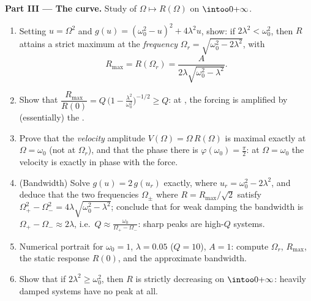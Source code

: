 \begin{problem}
\medskip
\noindent\textbf{Part III --- The  curve.} Study of
$\Omega \mapsto R(\Omega)$ on $\intoo0{+\infty}$.
\begin{enumerate}[resume]
  \item Setting $u = \Omega^2$ and $g(u) = (\omega_0^2 - u)^2 +
        4\lambda^2 u$, show: if $2\lambda^2 < \omega_0^2$, then $R$
        attains a strict maximum at the \emph{ frequency}
        $\Omega_r = \sqrt{\omega_0^2 - 2\lambda^2}$, with
        \[
        R_{\max} = R(\Omega_r)
        = \frac{A}{2\lambda\sqrt{\omega_0^2 - \lambda^2}} .
        \]
  \item Show that $\dfrac{R_{\max}}{R(0)} = Q\,\bigl(1 -
        \tfrac{\lambda^2}{\omega_0^2}\bigr)^{-1/2} \geq Q$: at
        , the forcing is amplified by (essentially) the
        .
  \item Prove that the \emph{velocity} amplitude $V(\Omega) =
        \Omega\,R(\Omega)$ is maximal exactly at $\Omega =
        \omega_0$ (not at $\Omega_r$), and that the phase there is
        $\varphi(\omega_0) = \frac\pi2$: at $\Omega = \omega_0$
        the velocity is exactly in phase with the force.
  \item (Bandwidth) Solve $g(u) = 2\,g(u_r)$ exactly, where $u_r =
        \omega_0^2 - 2\lambda^2$, and deduce that the two
        frequencies $\Omega_\pm$ where $R = R_{\max}/\sqrt2$
        satisfy $\Omega_+^2 - \Omega_-^2 =
        4\lambda\sqrt{\omega_0^2 - \lambda^2}$; conclude that for
        weak damping the bandwidth is $\Omega_+ - \Omega_-
        \approx 2\lambda$, i.e.\ $Q \approx
        \frac{\omega_0}{\Omega_+ - \Omega_-}$: sharp 
        peaks are high-$Q$ systems.
  \item Numerical portrait for $\omega_0 = 1$, $\lambda = 0.05$
        ($Q = 10$), $A = 1$: compute $\Omega_r$, $R_{\max}$, the
        static response $R(0)$, and the approximate bandwidth.
  \item Show that if $2\lambda^2 \geq \omega_0^2$, then $R$ is
        strictly decreasing on $\intoo0{+\infty}$: heavily damped
        systems have no  peak at all.
\end{enumerate}


\end{problem}
